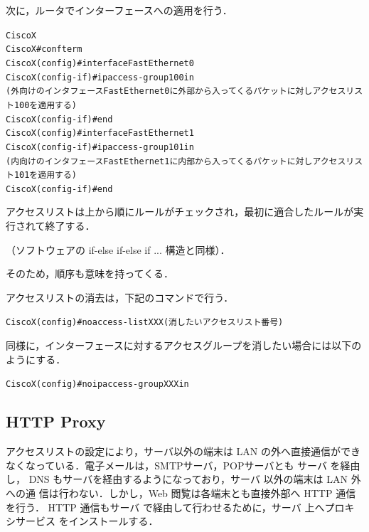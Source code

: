 次に，ルータでインターフェースへの適用を行う．
\begin{center}
\begin{breakbox}
\begin{alltt}
CiscoX%
CiscoX# conf term
CiscoX(config)# interface FastEthernet0
CiscoX(config-if)# ip access-group 100 in
                (外向けのインタフェースFastEthernet0に外部から入ってくるパケットに対しアクセスリスト100を適用する)
CiscoX(config-if)# end
CiscoX(config)# interface FastEthernet1
CiscoX(config-if)# ip access-group 101 in
                (内向けのインタフェースFastEthernet1に内部から入ってくるパケットに対しアクセスリスト101を適用する)
CiscoX(config-if)# end
\end{alltt}
\end{breakbox}
\end{center}

アクセスリストは上から順にルールがチェックされ，最初に適合したルールが実
行されて終了する．

（ソフトウェアの if-else if-else if ... 構造と同様）．

そのため，順序も意味を持ってくる．

アクセスリストの消去は，下記のコマンドで行う．
\begin{center}
\begin{breakbox}
\begin{alltt}
CiscoX(config)# no access-list XXX(消したいアクセスリスト番号)
\end{alltt}
\end{breakbox}
\end{center}
同様に，インターフェースに対するアクセスグループを消したい場合には以下のようにする．
\begin{center}
\begin{breakbox}
\begin{alltt}
CiscoX(config)# no ip access-group XXX in
\end{alltt}
\end{breakbox}
\end{center}



%
\subsection{HTTP Proxy}
アクセスリストの設定により，サーバ以外の端末は LAN の外へ直接通信ができ
なくなっている．電子メールは，SMTPサーバ，POPサーバとも サーバ を経由し，
DNS もサーバを経由するようになっており，サーバ 以外の端末は LAN 外への通
信は行わない．しかし，Web 閲覧は各端末とも直接外部へ HTTP 通信を行う．
HTTP 通信もサーバ で経由して行わせるために，サーバ 上へプロキシサービス
をインストールする．

